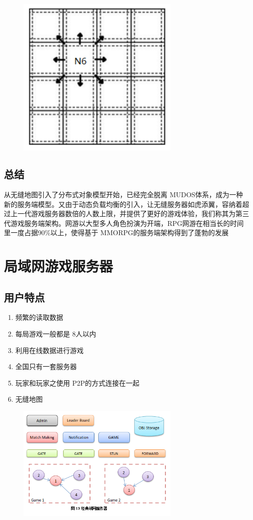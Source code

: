 \documentclass[UTF8,a4paper,8pt]{ctexart}
\begin{document}
						\begin{figure}[h] 	
							\centering
							\includegraphics[width=8cm,clip]{gameServer12.png} 	
							\label{fig:gameServer12}
						\end{figure} 
    	\subsection{总结}	从无缝地图引入了分布式对象模型开始，已经完全脱离 MUDOS体系，成为一种新的服务端模型。又由于动态负载均衡的引入，让无缝服务器如虎添翼，容纳着超过上一代游戏服务器数倍的人数上限，并提供了更好的游戏体验，我们称其为第三代游戏服务端架构。网游以大型多人角色扮演为开端，RPG网游在相当长的时间里一度占据90\%以上，使得基于 MMORPG的服务端架构得到了蓬勃的发展
    	
\newpage
\section{局域网游戏服务器}
		\subsection{用户特点}
		\begin{enumerate}[fullwidth,itemindent = 2em]
			\item  频繁的读取数据
			\item  每局游戏一般都是 8人以内
			\item  利用在线数据进行游戏
			\item  全国只有一套服务器
			\item  玩家和玩家之使用 P2P的方式连接在一起
			\item  无缝地图
		\end{enumerate}
		
		\begin{figure}[h] 	
			\centering
			\includegraphics[width=8cm,clip]{gameServer13.png} 	
			\label{fig:gameServer13}
		\end{figure} 
		
\end{document}
